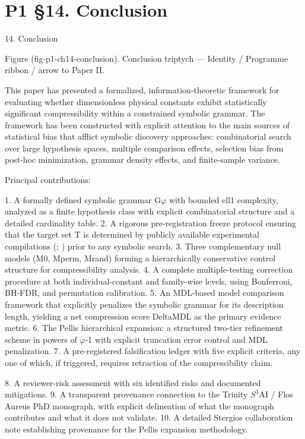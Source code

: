 
\section{P1 §14. Conclusion}

14. Conclusion

     Figure (fig-p1-ch14-conclusion). Conclusion triptych --- Identity / Programme ribbon / arrow to
                                               Paper II.

  This paper has presented a formalized, information-theoretic framework for evaluating
  whether     dimensionless     physical   constants exhibit    statistically significant
  compressibility within a constrained symbolic grammar. The framework has been
  constructed with explicit attention to the main sources of statistical bias that afflict
  symbolic discovery approaches: combinatorial search over large hypothesis spaces,
  multiple comparison effects, selection bias from post-hoc minimization, grammar
  density effects, and finite-sample variance.

  Principal contributions:

  1. A formally defined symbolic grammar G$\varphi$ with bounded ell1 complexity, analyzed as
  a finite hypothesis class with explicit combinatorial structure and a detailed cardinality
  table.
  2. A rigorous pre-registration freeze protocol ensuring that the target set T is
  determined by publicly available experimental compilations (\citealp{pdg2024}; \citealp{codata2022})
  prior to any symbolic search.
  3. Three complementary null models (M0, Mperm, Mrand) forming a hierarchically
  conservative control structure for compressibility analysis.
  4. A complete multiple-testing correction procedure at both individual-constant and
  family-wise levels, using Bonferroni, BH-FDR, and permutation calibration.
  5. An MDL-based model comparison framework \citep{barron1998,grunwald2007} that explicitly penalizes the symbolic grammar for its description
  length, yielding a net compression score DeltaMDL as the primary evidence metric.
  6. The Pellis hierarchical expansion: a structured two-tier refinement scheme in powers
  of $\varphi$-1 with explicit truncation error control and MDL penalization.
  7. A pre-registered falsification ledger with five explicit criteria, any one of which, if
  triggered, requires retraction of the compressibility claim.

  8. A reviewer-risk assessment with six identified risks and documented mitigations.
  9. A transparent provenance connection to the Trinity $S^{3}$AI / Flos Aureus PhD
  monograph, with explicit delineation of what the monograph contributes and what it
  does not validate.
  10. A detailed Stergios collaboration note establishing provenance for the Pellis
  expansion methodology.

